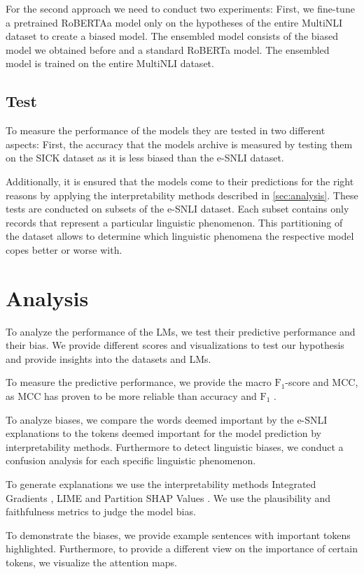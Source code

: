 \documentclass[12pt,a4paper]{article}
\begin{document}
For the second approach we need to conduct two experiments: First, we fine-tune a pretrained RoBERTAa model only on the hypotheses of the entire MultiNLI dataset to create a biased model. The ensembled model consists of the biased model we obtained before and a standard RoBERTa model. The ensembled model is trained on the entire MultiNLI dataset.

\subsection{Test}
To measure the performance of the models they are tested in two different aspects: First, the accuracy that the models archive is measured by testing them on the SICK dataset as it is less biased than the e-SNLI dataset.

Additionally, it is ensured that the models come to their predictions for the right reasons by applying the interpretability methods described in \autoref{sec:analysis}. These tests are conducted on subsets of the e-SNLI dataset. Each subset contains only records that represent a particular linguistic phenomenon. This partitioning of the dataset allows to determine which linguistic phenomena the respective model copes better or worse with.

\section{Analysis}


To analyze the performance of the \acp{LM}, we test their predictive performance and their bias. We provide different scores and visualizations to test our hypothesis and provide insights into the datasets and \acp{LM}.

To measure the predictive performance, we provide the macro $\text{F}_1$-score \parencite{macrof1} and \ac{MCC}\parencite{mcc}, as \ac{MCC} has proven to be more reliable than accuracy and $\text{F}_1$ \parencite{mccGood}.


To analyze biases, we compare the words deemed important by the \ac{e-SNLI} explanations to the tokens deemed important for the model prediction by interpretability methods. Furthermore to detect linguistic biases, we conduct a confusion analysis for each specific linguistic phenomenon.

To generate explanations we use the interpretability methods Integrated Gradients \parencite{sundararajan2017integratedgradients}, \ac{LIME} \parencite{ribeiro2016lime} and Partition SHAP Values \parencite{lundberg2017shap}. We use the plausibility and faithfulness \parencite{attanasio2022ferret} metrics to judge the model bias.

To demonstrate the biases, we provide example sentences with important tokens highlighted. Furthermore, to provide a different view on the importance of certain tokens, we visualize the attention maps.

\printbibliography
\end{document}
